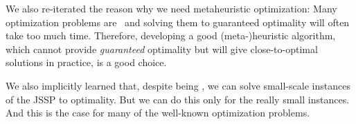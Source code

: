 We also re-iterated the reason why we need metaheuristic optimization:
Many optimization problems are \NPhard\ and solving them to guaranteed optimality will often take too much time.
Therefore, developing a good (meta-)heuristic algorithm, which cannot provide \emph{guaranteed} optimality but will give close-to-optimal solutions in practice, is a good choice.

We also implicitly learned that, despite being \NPhard, we can solve small-scale instances of the \gls{JSSP} to optimality.
But we can do this only for the really small instances.
And this is the case for many of the well-known optimization problems.%
\endhsection%
\endhsection%
%